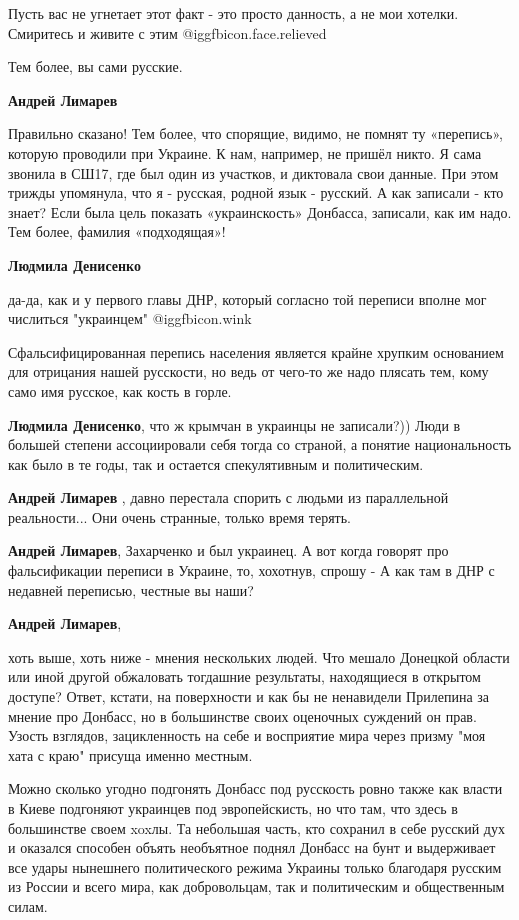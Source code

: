 \begin{itemize}
\begin{itemize}
Пусть вас не угнетает этот факт - это просто данность, а не мои хотелки.
Смиритесь и живите с этим  @igg{fbicon.face.relieved} 

Тем более, вы сами русские.

\textbf{Андрей Лимарев} 

Правильно сказано! Тем более, что спорящие, видимо, не помнят ту «перепись»,
которую проводили при Украине. К нам, например, не пришёл никто. Я сама звонила
в СШ17, где был один из участков, и диктовала свои данные. При этом трижды
упомянула, что я - русская, родной язык - русский. А как записали - кто знает?
Если была цель показать «украинскость» Донбасса, записали, как им надо. Тем
более, фамилия «подходящая»!


\textbf{Людмила Денисенко} 

да-да, как и у первого главы ДНР, который согласно той переписи вполне мог
числиться "украинцем" @igg{fbicon.wink} 

Сфальсифицированная перепись населения является крайне хрупким основанием для
отрицания нашей русскости, но ведь от чего-то же надо плясать тем, кому само
имя русское, как кость в горле.

\textbf{Людмила Денисенко}, что ж крымчан в украинцы не записали?)) Люди в большей степени ассоциировали себя тогда со страной, а понятие национальность как было в те годы, так и остается спекулятивным и политическим.

\textbf{Андрей Лимарев} , давно перестала спорить с людьми из параллельной реальности... Они очень странные, только время терять.

\textbf{Андрей Лимарев}, Захарченко и был украинец. А вот когда говорят про фальсификации переписи в Украине, то, хохотнув, спрошу - А как там в ДНР с недавней переписью, честные вы наши?

\textbf{Андрей Лимарев}, 

хоть выше, хоть ниже - мнения нескольких людей. Что мешало Донецкой области или
иной другой обжаловать тогдашние результаты, находящиеся в открытом доступе?
Ответ, кстати, на поверхности и как бы не ненавидели Прилепина за мнение про
Донбасс, но в большинстве своих оценочных суждений он прав. Узость взглядов,
зацикленность на себе и восприятие мира через призму "моя хата с краю" присуща
именно местным.

Можно сколько угодно подгонять Донбасс под русскость ровно также как власти в
Киеве подгоняют украинцев под эвропейскисть, но что там, что здесь в
большинстве своем xoxлы. Та небольшая часть, кто сохранил в себе русский дух и
оказался способен объять необъятное поднял Донбасс на бунт и выдерживает все
удары нынешнего политического режима Украины только благодаря русским из России
и всего мира, как добровольцам, так и политическим и общественным силам.


\end{itemize}
\end{itemize}
